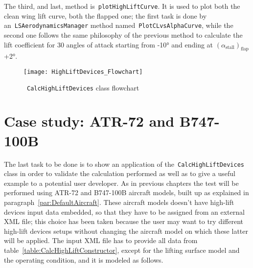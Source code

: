 \bigskip
\noindent
The third, and last, method is~\lstinline[language=Java]!plotHighLiftCurve!. It is used to plot both the clean wing lift curve, both the flapped one; the first task is done by an~\lstinline[language=Java]!LSAerodynamicsManager! method named~\lstinline[language=Java]!PlotCLvsAlphaCurve!, while the second one follows the same philosophy of the previous method to calculate the lift coefficient for 30 angles of attack starting from -10° and ending at $\left(\alpha_{\text{stall}}\right)_{\text{flap}}$+2°.
%
\begin{figure}[H]
  \centering
  \texttt{[image: HighLiftDevices\_Flowchart]}
  \caption{~\lstinline[language=Java]!CalcHighLiftDevices! class flowchart}
  \label{fig:CalcHighLiftFlowchart}
\end{figure}
%
\section{Case study: ATR-72 and B747-100B}
\label{par:CaseStudyHighLift}
The last task to be done is to show an application of the~\lstinline[language=Java]!CalcHighLiftDevices! class in order to validate the calculation performed as well as to give a useful example to a potential user developer. 
%
As in previous chapters the test will be performed using ATR-72 and B747-100B aircraft models, built up as explained in paragraph~\ref{par:DefaultAircraft}. These aircraft models doesn't have high-lift devices input data embedded, so that they have to be assigned from an external XML file; this choice has been taken because the user may want to try different high-lift devices setups without changing the aircraft model on which these latter will be applied.
%
The input XML file\cite{wiki:xml} has to provide all data from table~\ref{table:CalcHighLiftConstructor}, except for the lifting surface model and the operating condition, and it is modeled as follows.

